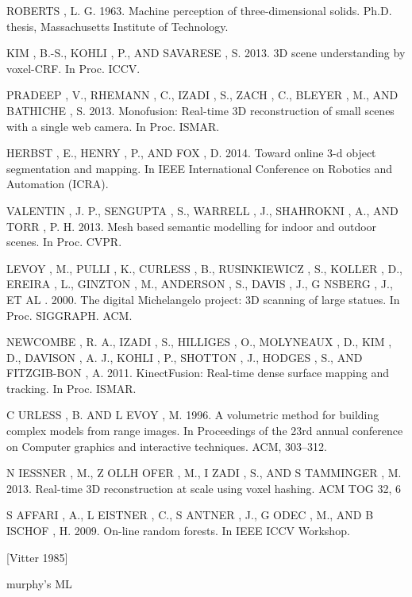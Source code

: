 \documentclass{llncs}
\begin{document}

\begin{thebibliography}{1}

  ROBERTS , L. G. 1963. Machine perception of three-dimensional solids. Ph.D. thesis, Massachusetts Institute of Technology.

  KIM , B.-S., KOHLI , P., AND SAVARESE , S. 2013. 3D scene understanding by voxel-CRF. In Proc. ICCV.

  PRADEEP , V., RHEMANN , C., IZADI , S., ZACH , C., BLEYER , M., AND BATHICHE , S. 2013. Monofusion: Real-time 3D reconstruction of small scenes with a single web camera. In Proc. ISMAR.

  HERBST , E., HENRY , P., AND FOX , D. 2014. Toward online 3-d object segmentation and mapping. In IEEE International Conference on Robotics and Automation (ICRA).

  VALENTIN , J. P., SENGUPTA , S., WARRELL , J., SHAHROKNI , A., AND TORR , P. H. 2013. Mesh based semantic modelling for indoor and outdoor scenes. In Proc. CVPR.

  LEVOY , M., PULLI , K., CURLESS , B., RUSINKIEWICZ , S., KOLLER , D., EREIRA , L., GINZTON , M., ANDERSON , S., DAVIS , J., G NSBERG , J., ET AL . 2000. The digital Michelangelo project: 3D scanning of large statues. In Proc. SIGGRAPH. ACM.

  NEWCOMBE , R. A., IZADI , S., HILLIGES , O., MOLYNEAUX , D., KIM , D., DAVISON , A. J., KOHLI , P., SHOTTON , J., HODGES , S., AND FITZGIB-BON , A. 2011. KinectFusion: Real-time dense surface mapping and tracking. In Proc. ISMAR.
  
  C URLESS , B. AND L EVOY , M. 1996. A volumetric method for building complex models from range images. In Proceedings of the 23rd annual conference on Computer graphics and interactive techniques. ACM, 303–312.
  
  N IESSNER , M., Z OLLH OFER , M., I ZADI , S., AND S TAMMINGER , M. 2013. Real-time 3D reconstruction at scale using voxel hashing. ACM TOG 32, 6
  
  S AFFARI , A., L EISTNER , C., S ANTNER , J., G ODEC , M., AND B ISCHOF , H. 2009. On-line random forests. In IEEE ICCV Workshop.
  
  [Vitter 1985]
  
  murphy's ML
	
\end{thebibliography}

\end{document}
